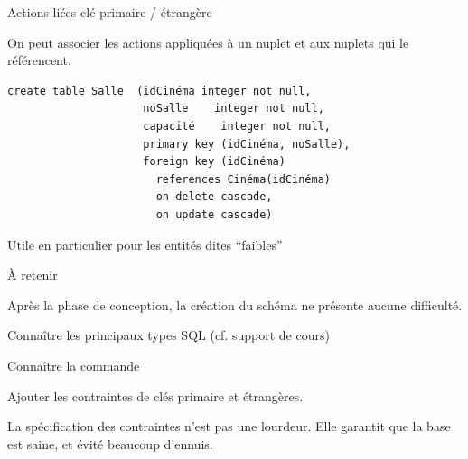 \begin{frame}[fragile]{Actions liées clé primaire / étrangère}

On peut associer les actions appliquées à un nuplet et aux nuplets
qui le référencent.
\vfill

\begin{verbatim}
create table Salle  (idCinéma integer not null, 
                     noSalle    integer not null,
                     capacité    integer not null,
                     primary key (idCinéma, noSalle),
                     foreign key (idCinéma) 
                       references Cinéma(idCinéma)
                       on delete cascade,
                       on update cascade)
\end{verbatim}

\vfill

\begin{blocgauche}
Utile en particulier pour les entités dites ``faibles''
\end{blocgauche}
\end{frame}
\begin{frame}{À retenir}

Après la phase de conception, la création du schéma ne présente aucune difficulté.
\vfill

\begin{redbullet}
   \item  Connaître les principaux types SQL (cf. support de cours)
   \item Connaître la commande 
   \item Ajouter les contraintes de clés primaire et étrangères.
\end{redbullet}

\vfill

\begin{blocgauche}
La spécification des contraintes n'est pas une lourdeur. Elle garantit que la base est saine,
et évité beaucoup d'ennuis.
\end{blocgauche}
\end{frame}

